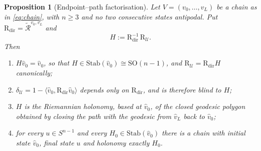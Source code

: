 \documentclass[11pt,a4paper]{article}
\theoremstyle{plain}
\newtheorem{proposition}[theorem]{Proposition}
\theoremstyle{definition}
\numberwithin{equation}{section}
\newcommand{\SO}{\mathrm{SO}}
\newcommand{\Stab}{\mathrm{Stab}}
\newcommand{\Rmin}{\widetilde{\mathcal{R}}}
\newcommand{\Uc}{\mathcal{U}}
\begin{document}
\begin{proposition}[Endpoint--path factorisation]\label{prop:holonomy}
Let $V = (v_0,\dots,v_L)$ be a chain as in \eqref{eq:chain}, with
$n \ge 3$ and no two consecutive states antipodal. Put
$\mathrm{R}_{\mathrm{dir}} = \Rmin^{v_0,v_L}$ and
\begin{equation}\label{eq:holdef}
H := \mathrm{R}_{\mathrm{dir}}^{-1}\,\mathrm{R}_\Uc .
\end{equation}
Then
\begin{enumerate}
\item[(i)] $H\hat{v}_0 = \hat{v}_0$, so that
$H \in \Stab(\hat{v}_0) \cong \SO(n-1)$, and
$\mathrm{R}_\Uc = \mathrm{R}_{\mathrm{dir}}H$ canonically;
\item[(ii)] $\delta_\Uc = 1 - \langle \hat{v}_0,
\mathrm{R}_{\mathrm{dir}}\hat{v}_0\rangle$ depends only on
$\mathrm{R}_{\mathrm{dir}}$, and is therefore blind to $H$;
\item[(iii)] $H$ is the Riemannian holonomy, based at $\hat{v}_0$, of
the closed geodesic polygon obtained by closing the path with the
geodesic from $\hat{v}_L$ back to $\hat{v}_0$;
\item[(iv)] for every $u \in S^{n-1}$ and every
$H_0 \in \Stab(\hat{v}_0)$ there is a chain with initial state
$\hat{v}_0$, final state $u$ and holonomy exactly $H_0$.
\end{enumerate}
\end{proposition}
\end{document}
